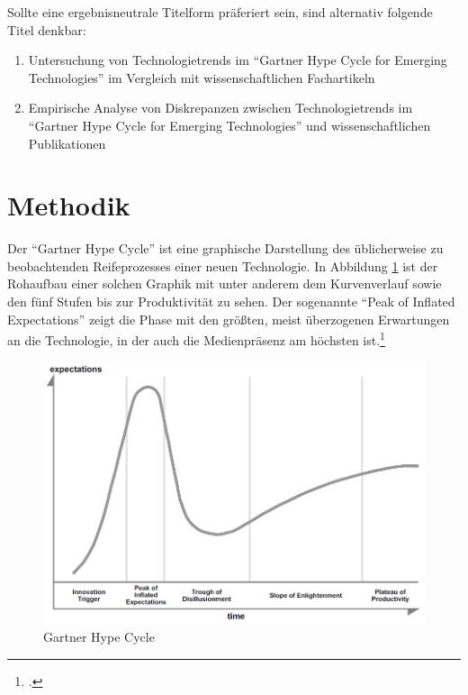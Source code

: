 Sollte eine ergebnisneutrale Titelform präferiert sein, sind alternativ folgende Titel denkbar:
\begin{enumerate}
	\item Untersuchung von Technologietrends im "`Gartner Hype Cycle for Emerging Technologies"' im Vergleich mit wissenschaftlichen Fachartikeln
	\item Empirische Analyse von Diskrepanzen zwischen Technologietrends im "`Gartner Hype Cycle for Emerging Technologies"' und wissenschaftlichen Publikationen
\end{enumerate}

\section{Methodik}
Der "`Gartner Hype Cycle"' ist eine graphische Darstellung des üblicherweise zu beobachtenden Reifeprozesses einer neuen Technologie. In Abbildung \ref{fig:ghc} ist der Rohaufbau einer solchen Graphik mit unter anderem dem Kurvenverlauf sowie den fünf Stufen bis zur Produktivität zu sehen. Der sogenannte "`Peak of Inflated Expectations"' zeigt die Phase mit den größten, meist überzogenen Erwartungen an die Technologie, in der auch die Medienpräsenz am höchsten ist.\footcite[Vgl.][S.~3f]{Fenn2017}

\begin{figure}
	\centering
	\includegraphics[width=0.9\linewidth]{abbildungen/ghc}
	\caption{Gartner Hype Cycle}
	\label{fig:ghc}
\end{figure}

